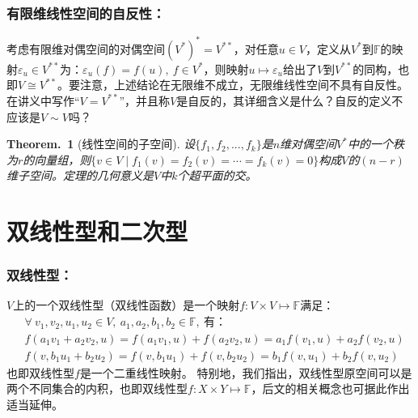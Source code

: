 \documentclass[zihao=-4,UTF8]{report}
\theoremstyle{mystyle} %
\newtheorem{theorem}{Theorem.\,}
\begin{document}
\subsubsection{有限维线性空间的自反性：}
考虑有限维对偶空间的对偶空间$(V^*)^* = V^{**}$，对任意$u\in V$，定义从$V^*$到$\mathbb{F}$的映射$\varepsilon_u \in V^{**}$为：$\varepsilon_u(f) = f(u),\ f \in V^*$，则映射$u \longmapsto \varepsilon_u$给出了$V$到$V^{**}$的同构，也即$V \cong  V^{**}$。要注意，上述结论在无限维不成立，无限维线性空间不具有自反性。{\color{red}在讲义中写作“$V = V^{**}$”，并且称$V$是自反的，其详细含义是什么？自反的定义不应该是$V \sim V$吗？}

\begin{theorem}[线性空间的子空间]
    设$\{f_1,f_2,...,f_k\}$是$n$维对偶空间$V^*$中的一个秩为$r$的向量组，则$\{v \in V\mid f_1(v) = f_2(v) = \cdots = f_k(v) = 0\}$构成$V$的$(n - r)$维子空间。{\color{gray}\small 定理的几何意义是$V$中$k$个超平面的交。}
\end{theorem}
   
\section{双线性型和二次型}

\subsubsection{双线性型：}
$V$上的一个双线性型（双线性函数）是一个映射$f: V \times V \longmapsto \mathbb{F}$满足：
\begin{align*}
    &\forall\  v_1,v_2,u_1,u_2 \in V,\ a_1,a_2,b_1,b_2 \in \mathbb{F},\ \text{有：}\\
    &f(a_1v_1+a_2v_2,u) = f(a_1v_1,u) + f(a_2v_2,u) = a_1f(v_1,u) + a_2f(v_2,u)\\
    &f(v,b_1u_1 + b_2u_2) = f(v,b_1u_1) + f(v,b_2u_2) = b_1f(v,u_1) + b_2f(v,u_2)
\end{align*}
也即双线性型$f$是一个二重线性映射。
{\color{gray}\small 特别地，我们指出，双线性型原空间可以是两个不同集合的内积，也即双线性型$f:X\times Y \longmapsto \mathbb{F}$，后文的相关概念也可据此作出适当延伸。}
\end{document}
